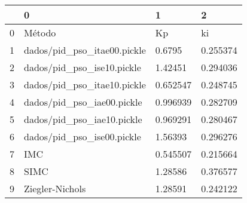 \begin{tabular}{llll}
\toprule
{} &                            0 &         1 &         2 \\
\midrule
0 &                       Método &        Kp &        ki \\
1 &  dados/pid\_pso\_itae00.pickle &    0.6795 &  0.255374 \\
2 &   dados/pid\_pso\_ise10.pickle &   1.42451 &  0.294036 \\
3 &  dados/pid\_pso\_itae10.pickle &  0.652547 &  0.248745 \\
4 &   dados/pid\_pso\_iae00.pickle &  0.996939 &  0.282709 \\
5 &   dados/pid\_pso\_iae10.pickle &  0.969291 &  0.280467 \\
6 &   dados/pid\_pso\_ise00.pickle &   1.56393 &  0.296276 \\
7 &                          IMC &  0.545507 &  0.215664 \\
8 &                         SIMC &   1.28586 &  0.376577 \\
9 &              Ziegler-Nichols &   1.28591 &  0.242122 \\
\bottomrule
\end{tabular}
